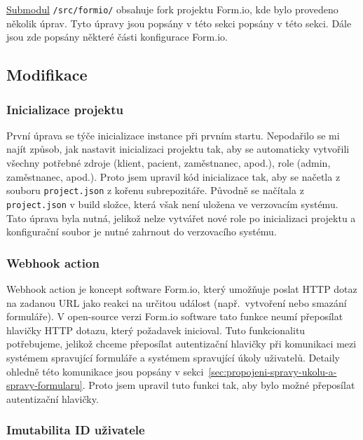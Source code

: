 \href{https://git-scm.com/book/en/v2/Git-Tools-Submodules}{Submodul} \texttt{/src/formio/} obsahuje fork projektu Form.io, kde bylo provedeno několik úprav.
Tyto úpravy jsou popsány v této sekci popsány v této sekci.
Dále jsou zde popsány některé části konfigurace Form.io.

\subsection{Modifikace}\label{subsec:modifikace}

\subsubsection{Inicializace projektu}\label{subsubsec:inicializace-projektu}

První úprava se týče inicializace instance při prvním startu.
Nepodařilo se mi najít způsob, jak nastavit inicializaci projektu tak, aby se automaticky vytvořili všechny potřebné zdroje (klient, pacient, zaměstnanec, apod.), role (admin, zaměstnanec, apod.).
Proto jsem upravil kód inicializace tak, aby se načetla z souboru \texttt{project.json} z kořenu subrepozitáře.
Původně se načítala z \texttt{project.json} v build složce, která však není uložena ve verzovacím systému.
Tato úprava byla nutná, jelikož nelze vytvářet nové role po inicializaci projektu a konfigurační soubor je nutné zahrnout do verzovacího systému.

\subsubsection{Webhook action}\label{subsubsec:webhook-action}

Webhook action je koncept software Form.io, který umožňuje poslat HTTP dotaz na zadanou URL jako reakci na určitou událost (např.\ vytvoření nebo smazání formuláře).
V open-source verzi Form.io software tato funkce neumí přeposílat hlavičky HTTP dotazu, který požadavek inicioval.
Tuto funkcionalitu potřebujeme, jelikož chceme přeposílat autentizační hlavičky při komunikaci mezi systémem spravující formuláře a systémem spravující úkoly uživatelů.
Detaily ohledně této komunikace jsou popsány v sekci\ \ref{sec:propojeni-spravy-ukolu-a-spravy-formularu}.
Proto jsem upravil tuto funkci tak, aby bylo možné přeposílat autentizační hlavičky.

\subsubsection{Imutabilita ID uživatele}\label{subsubsec:imutabilita-id-uzivatele}

